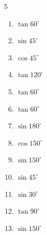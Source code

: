 \begin{multicols}{5}
\begin{enumerate}
  \item $\displaystyle \tan{60^\circ}$


  \item $\displaystyle \sin{45^\circ}$


  \item $\displaystyle \cos{45^\circ}$


  \item $\displaystyle \tan{120^\circ}$


  \item $\displaystyle \tan{60^\circ}$


  \item $\displaystyle \tan{60^\circ}$


  \item $\displaystyle \sin{180^\circ}$

        \phantom{$\displaystyle =0$}

  \item $\displaystyle \cos{150^\circ}$


  \item $\displaystyle \sin{150^\circ}$


  \item $\displaystyle \sin{45^\circ}$


  \item $\displaystyle \sin{30^\circ}$


  \item $\displaystyle \tan{90^\circ}$

        \phantom{$\displaystyle なし$}

  \item $\displaystyle \sin{150^\circ}$


\end{enumerate}
\end{multicols}
